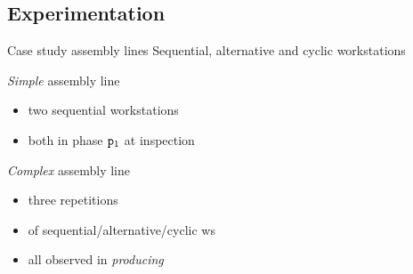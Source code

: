   \subsection{Experimentation}
    \begin{frame}{Case study assembly lines}
      Sequential, alternative and cyclic workstations
      
      \vspace{0.5em}
      \begin{minipage}{0.3\textwidth}
        \begin{center}\scalebox{0.5}{}\end{center}
      \end{minipage}
      \begin{minipage}{0.325\textwidth}
        \begin{center}\scalebox{0.5}{}\end{center}
      \end{minipage}
      \begin{minipage}{0.325\textwidth}
        \begin{center}\scalebox{0.5}{}\end{center}
      \end{minipage}
      
      \vspace{1em}
      \begin{minipage}{0.5\textwidth}
        \textit{Simple} assembly line
        \begin{itemize}
          \item two sequential workstations
          \item both in phase $\mathtt{p}_1$ at inspection
        \end{itemize}
      \end{minipage}
      \begin{minipage}{0.45\textwidth}
        \begin{center}\scalebox{0.7}{}\end{center}
      \end{minipage}
      
      \vspace{2em}
      \begin{minipage}{0.5\textwidth}
        \textit{Complex} assembly line
        \begin{itemize}
          \item three repetitions
          \item of sequential/alternative/cyclic ws
          \item all observed in \textit{producing}
        \end{itemize}
      \end{minipage}
      \begin{minipage}{0.45\textwidth}
        \begin{center}\scalebox{0.7}{}\end{center}
      \end{minipage}
    \end{frame}
    
